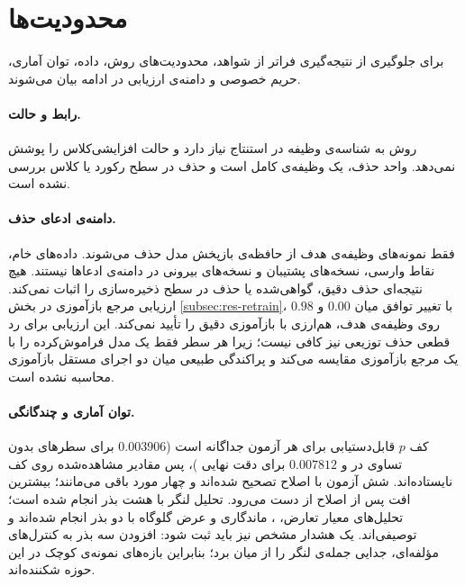 \section{محدودیت‌ها}
\label{sec:concl-limitations}

برای جلوگیری از نتیجه‌گیری فراتر از شواهد، محدودیت‌های روش، داده، توان آماری، حریم خصوصی و دامنه‌ی ارزیابی در ادامه بیان می‌شوند.

\paragraph{رابط و حالت.} روش به شناسه‌ی وظیفه در استنتاج نیاز دارد و حالت افزایشی‌کلاس را پوشش نمی‌دهد. واحد حذف، یک وظیفه‌ی کامل است و حذف در سطح رکورد یا کلاس بررسی نشده است.

\paragraph{دامنه‌ی ادعای حذف.} فقط نمونه‌های وظیفه‌ی هدف از حافظه‌ی بازپخش مدل حذف می‌شوند. داده‌های خام، نقاط وارسی، نسخه‌های پشتیبان و نسخه‌های بیرونی در دامنه‌ی ادعاها نیستند. هیچ نتیجه‌ای حذف دقیق، گواهی‌شده یا حذف در سطح ذخیره‌سازی را اثبات نمی‌کند. ارزیابی مرجع بازآموزی در بخش \ref{subsec:res-retrain}، با تغییر توافق میان $0.00$ و $0.98$ روی وظیفه‌ی هدف، هم‌ارزی با بازآموزی دقیق را تأیید نمی‌کند. این ارزیابی برای رد قطعی حذف توزیعی نیز کافی نیست؛ زیرا هر سطر فقط یک مدل فراموش‌کرده را با یک مرجع بازآموزی مقایسه می‌کند و پراکندگی طبیعی میان دو اجرای مستقل بازآموزی محاسبه نشده است.

\paragraph{توان آماری و چندگانگی.} کف $p$ قابل‌دستیابی برای هر آزمون جداگانه است ($0.003906$ برای سطرهای بدون تساوی در  و $0.007812$ برای دقت نهایی )، پس مقادیر مشاهده‌شده روی کف نایستاده‌اند. شش آزمون با اصلاح  تصحیح شده‌اند و چهار مورد باقی می‌مانند؛ بیشترین افت  پس از اصلاح از دست می‌رود. تحلیل لنگر با هشت بذر انجام شده است؛ تحلیل‌های معیار تعارض، ، ماندگاری و عرض گلوگاه با دو بذر انجام شده‌اند و توصیفی‌اند. یک هشدار مشخص نیز باید ثبت شود: افزودن سه بذر به کنترل‌های مؤلفه‌ای، جدایی جمله‌ی لنگر را از میان برد؛ بنابراین بازه‌های نمونه‌ی کوچک در این حوزه شکننده‌اند.

